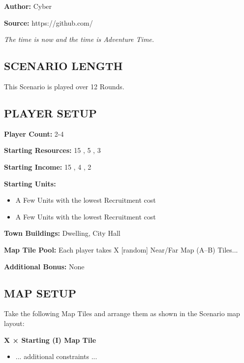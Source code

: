 
\begin{multicols*}{2}

\textbf{Author:} Cyber

\textbf{Source:} https://github.com/

\textit{The time is now and the time is Adventure Time.}

\subsection*{\MakeUppercase{Scenario Length}}

This Scenario is played over 12 Rounds.

\subsection*{\MakeUppercase{Player Setup}}

\textbf{Player Count:} 2-4

\textbf{Starting Resources:} 15 , 5 , 3 

\textbf{Starting Income:} 15 , 4 , 2 

\textbf{Starting Units:}
\begin{itemize}
  \item A Few  Units with the lowest Recruitment cost
  \item A Few  Units with the lowest Recruitment cost
\end{itemize}

\textbf{Town Buildings:}  Dwelling, City Hall

\textbf{Map Tile Pool:} Each player takes X [random] Near/Far Map (A--B) Tiles...

\textbf{Additional Bonus:} None

\subsection*{\MakeUppercase{Map Setup}}

Take the following Map Tiles and arrange them as shown in the Scenario map layout:

\textbf{X × Starting (I) Map Tile}
\begin{itemize}
    \item ... additional constraints ...
\end{itemize}


\end{multicols*}
